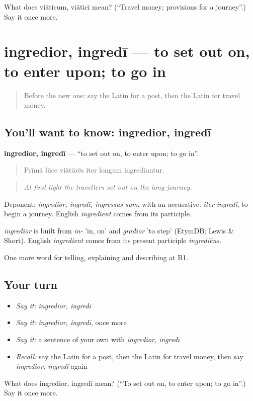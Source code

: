 \begin{tcolorbox}[breakable,colback=teal!4,colframe=teal!35!black,title={Before you move on}]
What does viāticum, viāticī mean? (\textquotedblleft{}Travel money; provisions for a journey\textquotedblright{}.) Say it once more.
\end{tcolorbox}
\section[ingredior, ingredī]{ingredior, ingredī — to set out on, to enter upon; to go in}

\label{lesson:LA-C427-ingredior}



\begin{quote}
Before the new one: say the Latin for a post, then the Latin for travel money.
\end{quote}

\subsection*{You'll want to know: ingredior, ingredī}
\textbf{ingredior, ingredī} — \textquotedblleft{}to set out on, to enter upon; to go in\textquotedblright{}.

\begin{quote}
Prīmā lūce viātōrēs iter longum ingrediuntur.
\end{quote}

\begin{quote}
\emph{At first light the travellers set out on the long journey.}
\end{quote}

Deponent: \emph{ingredior, ingredī, ingressus sum}, with an accusative: \emph{iter ingredī}, to begin a journey. English \emph{ingredient} comes from its participle.

\begin{cousinweb}
\emph{ingredior} is built from \emph{in-} 'in, on' and \emph{gradior} 'to step' (EtymDB; Lewis \& Short). English \emph{ingredient} comes from its present participle \emph{ingrediēns}.
\end{cousinweb}

\begin{grammarlens}[title={What you've built}]
One more word for telling, explaining and describing at B1.
\end{grammarlens}

\subsection*{Your turn}
\begin{itemize}
\raggedright
  \item \emph{Say it:} \emph{ingredior, ingredī}
  \item \emph{Say it:} \emph{ingredior, ingredī}, once more
  \item \emph{Say it:} a sentence of your own with \emph{ingredior, ingredī}
  \item \emph{Recall:} say the Latin for a post, then the Latin for travel money, then say \emph{ingredior, ingredī} again
\end{itemize}

\begin{tcolorbox}[breakable,colback=teal!4,colframe=teal!35!black,title={Before you move on}]
What does ingredior, ingredī mean? (\textquotedblleft{}To set out on, to enter upon; to go in\textquotedblright{}.) Say it once more.
\end{tcolorbox}
